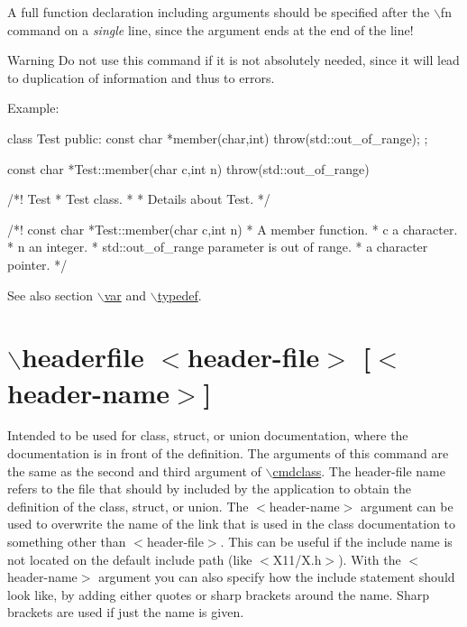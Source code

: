 A full function declaration including arguments should be specified after the $\backslash$fn command on a {\itshape single\/} line, since the argument ends at the end of the line!

\begin{DoxyWarning}{Warning}
Do not use this command if it is not absolutely needed, since it will lead to duplication of information and thus to errors.
\end{DoxyWarning}
\begin{DoxyParagraph}{Example:}

\begin{DoxyVerbInclude}
class Test
{
  public:
    const char *member(char,int) throw(std::out_of_range);
};

const char *Test::member(char c,int n) throw(std::out_of_range) {}

/*! \class Test
 * \brief Test class.
 *
 * Details about Test.
 */

/*! \fn const char *Test::member(char c,int n) 
 *  \brief A member function.
 *  \param c a character.
 *  \param n an integer.
 *  \exception std::out_of_range parameter is out of range.
 *  \return a character pointer.
 */
\end{DoxyVerbInclude}
 
\end{DoxyParagraph}
\begin{DoxySeeAlso}{See also}
section \hyperlink{commands_cmdvar}{$\backslash$var} and \hyperlink{commands_cmdtypedef}{$\backslash$typedef}.
\end{DoxySeeAlso}


 \hypertarget{commands_cmdheaderfile}{}\section{$\backslash$headerfile $<$header-\/file$>$ \mbox{[}$<$header-\/name$>$\mbox{]}}\label{commands_cmdheaderfile}
 Intended to be used for class, struct, or union documentation, where the documentation is in front of the definition. The arguments of this command are the same as the second and third argument of \hyperlink{commands_cmdclass}{$\backslash$cmdclass}. The header-\/file name refers to the file that should by included by the application to obtain the definition of the class, struct, or union. The $<$header-\/name$>$ argument can be used to overwrite the name of the link that is used in the class documentation to something other than $<$header-\/file$>$. This can be useful if the include name is not located on the default include path (like $<$X11/X.h$>$). With the $<$header-\/name$>$ argument you can also specify how the include statement should look like, by adding either quotes or sharp brackets around the name. Sharp brackets are used if just the name is given.



